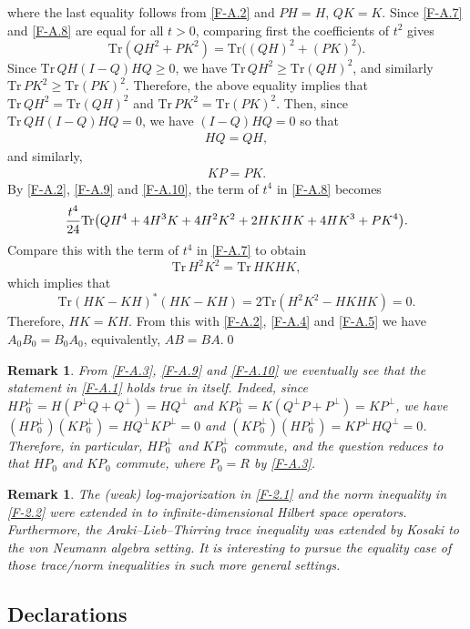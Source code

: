 \documentclass[11pt,reqno]{article}
\newtheorem{remark}[theorem]{Remark}
\numberwithin{equation}{section}
\def\Tr{\mathrm{Tr}}
\begin{document}
where the last equality follows from \eqref{F-A.2} and $PH=H$, $QK=K$. Since \eqref{F-A.7} and \eqref{F-A.8}
are equal for all $t>0$, comparing first the coefficients of $t^2$ gives
\[
\Tr(QH^2+PK^2)=\Tr\bigl((QH)^2+(PK)^2\bigr).
\]
Since $\Tr\,QH(I-Q)HQ\ge0$, we have $\Tr\,QH^2\ge\Tr(QH)^2$, and similarly $\Tr\,PK^2\ge\Tr(PK)^2$.
Therefore, the above equality implies that $\Tr\,QH^2=\Tr(QH)^2$ and $\Tr\,PK^2=\Tr(PK)^2$. Then, since
$\Tr\,QH(I-Q)HQ=0$, we have $(I-Q)HQ=0$ so that
\begin{align}\label{F-A.9}
HQ=QH,
\end{align}
and similarly,
\begin{align}\label{F-A.10}
KP=PK.
\end{align}
By \eqref{F-A.2}, \eqref{F-A.9} and \eqref{F-A.10}, the term of $t^4$ in \eqref{F-A.8} becomes
\[
{t^4\over24}\Tr\bigl(QH^4+4H^3K+4H^2K^2+2HKHK+4HK^3+PK^4\bigr).
\]
Compare this with the term of $t^4$ in \eqref{F-A.7} to obtain
\[
\Tr\,H^2K^2=\Tr\,HKHK,
\]
which implies that
\[
\Tr(HK-KH)^*(HK-KH)=2\Tr(H^2K^2-HKHK)=0.
\]
Therefore, $HK=KH$. From this with \eqref{F-A.2}, \eqref{F-A.4} and \eqref{F-A.5} we have $A_0B_0=B_0A_0$,
equivalently, $AB=BA$.\qed

\begin{remark}\label{R-A.2}\rm
From \eqref{F-A.3}, \eqref{F-A.9} and \eqref{F-A.10} we eventually see that the statement in \eqref{F-A.1}
holds true in itself. Indeed, since $HP_0^\perp=H(P^\perp Q+Q^\perp)=HQ^\perp$ and
$KP_0^\perp=K(Q^\perp P+P^\perp)=KP^\perp$, we have $(HP_0^\perp)(KP_0^\perp)=HQ^\perp KP^\perp=0$
and $(KP_0^\perp)(HP_0^\perp)=KP^\perp HQ^\perp=0$. Therefore, in particular, $HP_0^\perp$ and
$KP_0^\perp$ commute, and the question reduces to that $HP_0$ and $KP_0$ commute, where $P_0=R$ by
\eqref{F-A.3}.
\end{remark}

\begin{remark}\label{R-A.3}\rm
The (weak) log-majorization in \eqref{F-2.1} and the norm inequality in \eqref{F-2.2} were extended in \cite{Hi0}
to infinite-dimensional Hilbert space operators. Furthermore, the Araki--Lieb--Thirring trace inequality was
extended by Kosaki \cite{Ko} to the von Neumann algebra setting. It is interesting to pursue the equality case
of those trace/norm inequalities in such more general settings.
\end{remark}

\subsection*{Declarations}
\end{document}
